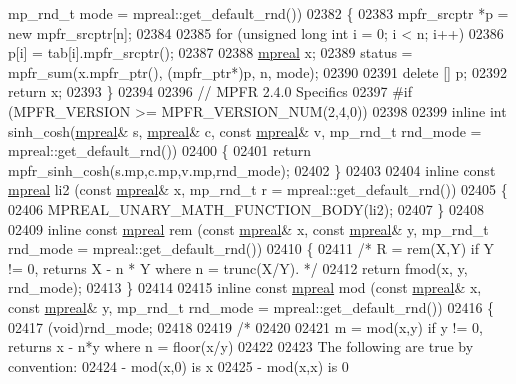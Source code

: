 \begin{DoxyCode}
{{      mp\_rnd\_t mode = mpreal::get\_default\_rnd())
02382 \{
02383     mpfr\_srcptr *p = \textcolor{keyword}{new} mpfr\_srcptr[n];
02384 
02385     \textcolor{keywordflow}{for} (\textcolor{keywordtype}{unsigned} \textcolor{keywordtype}{long} \textcolor{keywordtype}{int}  i = 0; i < n; i++)
02386         p[i] = tab[i].mpfr\_srcptr();
02387 
02388     \hyperlink{classmpfr_1_1mpreal}{mpreal} x;
02389     status = mpfr\_sum(x.mpfr\_ptr(), (mpfr\_ptr*)p, n, mode);
02390 
02391     \textcolor{keyword}{delete} [] p;
02392     \textcolor{keywordflow}{return} x;
02393 \}
02394 
02396 \textcolor{comment}{// MPFR 2.4.0 Specifics}
02397 \textcolor{preprocessor}{#if (MPFR\_VERSION >= MPFR\_VERSION\_NUM(2,4,0))}
02398 
02399 \textcolor{keyword}{inline} \textcolor{keywordtype}{int} sinh\_cosh(\hyperlink{classmpfr_1_1mpreal}{mpreal}& s, \hyperlink{classmpfr_1_1mpreal}{mpreal}& c, \textcolor{keyword}{const} \hyperlink{classmpfr_1_1mpreal}{mpreal}& v, mp\_rnd\_t rnd\_mode = 
      mpreal::get\_default\_rnd())
02400 \{
02401     \textcolor{keywordflow}{return} mpfr\_sinh\_cosh(s.mp,c.mp,v.mp,rnd\_mode);
02402 \}
02403 
02404 \textcolor{keyword}{inline} \textcolor{keyword}{const} \hyperlink{classmpfr_1_1mpreal}{mpreal} li2 (\textcolor{keyword}{const} \hyperlink{classmpfr_1_1mpreal}{mpreal}& x, mp\_rnd\_t r = mpreal::get\_default\_rnd())
02405 \{
02406     MPREAL\_UNARY\_MATH\_FUNCTION\_BODY(li2);
02407 \}
02408 
02409 \textcolor{keyword}{inline} \textcolor{keyword}{const} \hyperlink{classmpfr_1_1mpreal}{mpreal} rem (\textcolor{keyword}{const} \hyperlink{classmpfr_1_1mpreal}{mpreal}& x, \textcolor{keyword}{const} \hyperlink{classmpfr_1_1mpreal}{mpreal}& y, mp\_rnd\_t rnd\_mode = 
      mpreal::get\_default\_rnd())
02410 \{
02411     \textcolor{comment}{/*  R = rem(X,Y) if Y != 0, returns X - n * Y where n = trunc(X/Y). */}
02412     \textcolor{keywordflow}{return} fmod(x, y, rnd\_mode);
02413 \}
02414 
02415 \textcolor{keyword}{inline} \textcolor{keyword}{const} \hyperlink{classmpfr_1_1mpreal}{mpreal} mod (\textcolor{keyword}{const} \hyperlink{classmpfr_1_1mpreal}{mpreal}& x, \textcolor{keyword}{const} \hyperlink{classmpfr_1_1mpreal}{mpreal}& y, mp\_rnd\_t rnd\_mode = 
      mpreal::get\_default\_rnd())
02416 \{
02417     (void)rnd\_mode;
02418 
02419     \textcolor{comment}{/*}
02420 \textcolor{comment}{}
02421 \textcolor{comment}{    m = mod(x,y) if y != 0, returns x - n*y where n = floor(x/y)}
02422 \textcolor{comment}{}
02423 \textcolor{comment}{    The following are true by convention:}
02424 \textcolor{comment}{    - mod(x,0) is x}
02425 \textcolor{comment}{    - mod(x,x) is 0}
}}
\end{DoxyCode}
